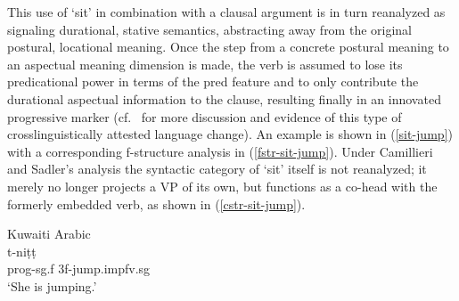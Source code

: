 \documentclass[output=paper,hidelinks]{langscibook}
\begin{document}
This use of `sit' in combination with a clausal argument is in turn reanalyzed as signaling durational, stative semantics, abstracting away from the original postural, locational meaning.  Once the step from a concrete postural meaning to an aspectual meaning dimension is made, the verb is assumed to lose its predicational power in terms of the {\sc pred} feature and to only contribute the durational aspectual information to the clause, resulting finally in an innovated progressive marker (cf.~\citet{deo15} for more discussion and evidence of this type of crosslinguistically attested language change).  An example is  shown in (\ref{sit-jump}) with a corresponding f-structure analysis in (\ref{fstr-sit-jump}).  Under Camillieri and Sadler's analysis the syntactic category of `sit' itself is not reanalyzed; it merely no longer projects a VP of its own, but functions as a co-head with the formerly embedded verb, as shown in (\ref{cstr-sit-jump}). 

\ea \label{sit-jump} Kuwaiti Arabic \citep[30]{camilleri2020grammaticalisation}\\
 {t-ni\d{t}\d{t}} \\
{\sc prog-sg.f} {{\sc 3f}-jump.{\sc impfv.sg}}\\
\glt `She is jumping.' 
\z 




    
\end{document}
